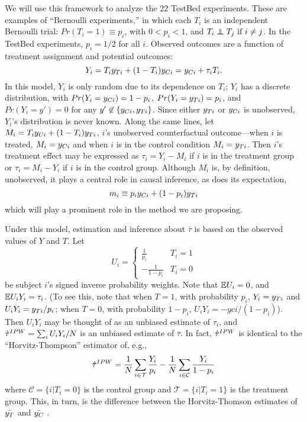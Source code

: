 We will use this framework to analyze the 22 TestBed experiments.
These are examples of ``Bernoulli experiments,'' in
which each $T_i$ is an
independent Bernoulli trial: $Pr(T_i=1)\equiv p_i$, with $0<p_i<1$, and
$T_i\independent T_j \text{ if } i\ne j$.
In the TestBed experiments,
$p_i=1/2$ for all $i$.
Observed outcomes are a function of treatment assignment and
potential outcomes:
\begin{equation*}
  Y_i=T_iy_{Ti}+(1-T_i)y_{Ci}=y_{Ci}+\tau_iT_i.
\end{equation*}
In this model, $Y_i$ is only random due to its dependence on $T_i$;
$Y_i$ has a discrete distribution, with $Pr(Y_i=y_{Ci})=1-p_i$,
$Pr(Y_i=y_{Ti})=p_i$, and $Pr(Y_i=y')=0$ for any
$y'\not\in\{y_{Ci},y_{Ti}\}$.
Since either $y_{Ti}$ or $y_{Ci}$ is unobserved, $Y_i$'s distribution is never known.
Along the same lines, let $M_i=T_iy_{Ci}+(1-T_i)y_{Ti}$, $i$'s unobserved
counterfactual outcome---when $i$ is treated, $M_i=y_{Ci}$ and when $i$
is in the control condition $M_i=y_{Ti}$.
Then $i$'s treatment effect may be expressed as $\tau_i=Y_i-M_i$ if
$i$ is in the treatment group or $\tau_i=M_i-Y_i$ if $i$ is in the
control group.
Although $M_i$ is, by definition, unobserved, it plays a central role in
causal inference, as does its expectation,
\begin{equation*}
m_i\equiv p_iy_{Ci}+(1-p_i)y_{Ti}
\end{equation*}
which will play a prominent role in the method we are proposing.

Under this model, estimation and inference about $\bar{\tau}$ is based on
the observed values of $Y$ and $T$.
Let
\begin{equation*}
U_i=\begin{cases}
\frac{1}{p_i} & T_i=1\\
-\frac{1}{1-p_i} & T_i=0
\end{cases}
\end{equation*}
be subject $i$'s signed inverse probability weights.
Note that $\mathbb{E} U_i=0$, and $\mathbb{E} U_iY_i=\tau_i$.
(To see this, note that when $T=1$, with probability $p_i$,
$Y_i=y_{Ti}$ and $U_iY_i=y_{Ti}/p_i$; when $T=0$, with probability
$1-p_i$, $U_iY_i=-yci/(1-p_i)$).
Then $U_iY_i$ may be thought of as an unbiased estimate of $\tau_i$, and $\hat{\tau}^{IPW}=\sum_iU_iY_i/N$ is an unbiased estimate
of $\bar{\tau}$.
In fact, $\hat{\tau}^{IPW}$ is identical to the ``Horvitz-Thompson'' estimator
of, e.g., \citet{aronowMiddleton}
\begin{equation*}
\hat{\tau}^{IPW}=\frac{1}{N}\displaystyle\sum_{i\in\mathcal{T}}
\frac{Y_i}{p_i}-\frac{1}{N}\displaystyle\sum_{i\in\mathcal{C}}\frac{Y_i}{1-p_i}
\end{equation*}
where $\mathcal{C} = \{i | T_i = 0\}$ is the control group and
$\mathcal{T} = \{i | T_i = 1\}$ is the treatment group.
This, in turn, is the difference between the Horvitz-Thomson
estimates of $\bar{y_T}$ and $\bar{y_C}$ \citep{horvitzThompson}.

